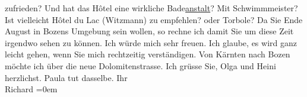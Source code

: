 \begin{ledgroupsized}[t]{13cm}
               zufrieden? Und hat das Hôtel eine wirkliche Bade\uline{anstalt}? Mit Schwimmmeister? Ist vielleicht Hôtel du Lac (Witzmann) zu empfehlen? oder Torbole? Da Sie Ende August in Bozens Umgebung sein wollen, so rechne ich damit Sie um diese Zeit irgendwo
               sehen zu können. Ich würde {\pb}mich
               sehr freuen. Ich glaube, es wird ganz leicht gehen, wenn Sie mich rechtzeitig
               verständigen. Von Kärnten nach Bozen möchte ich über die neue Dolomitenstrasse.\pend
           \pstart
           Ich grüsse Sie, Olga und Heini herzlichst. Paula
               tut dasselbe.\pend
           \pstart
           Ihr{\\[\baselineskip]}\spacefill\mbox{Richard}\pend
           \leftskip=0em{}
         
         \endnumbering{}\end{ledgroupsized}  \newcommand{\dateiname}{L01694}\newcommand{\titel}{Richard Beer-Hofmann an Arthur Schnitzler, 26. 7. 1907}\newcommand{\editorInnen}{Martin Anton Müller und Gerd-Hermann Susen}
      